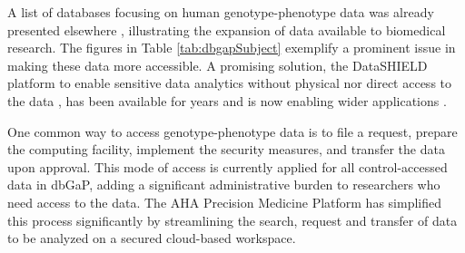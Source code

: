 \documentclass[letter]{bioinfo}
\begin{document}
A list of databases focusing on human genotype-phenotype data was already presented elsewhere \citep{Brookes:2015:Human}, illustrating the expansion of data available to biomedical research. The figures in Table \ref{tab:dbgapSubject} exemplify a prominent issue in making these data more accessible. A promising solution, the DataSHIELD platform to enable sensitive data analytics without physical nor direct access to the data \citep{Gaye:2014:DataSHIELD}, has been available for years and is now enabling wider applications \citep{Wilson:2017:DataSHIELD}.

One common way to access genotype-phenotype data is to file a request, prepare the computing facility, implement the security measures, and transfer the data upon approval. This mode of access is currently applied for all control-accessed data in dbGaP, adding a significant administrative burden to researchers who need access to the data. The AHA Precision Medicine Platform \citep{Kass-Hout:2018:American} has simplified this process significantly by streamlining the search, request and transfer of data to be analyzed on a secured cloud-based workspace.
\end{document}

